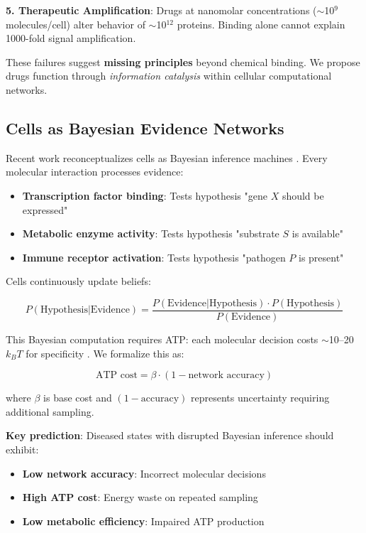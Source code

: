 \documentclass{article}
\begin{document}
\textbf{5. Therapeutic Amplification}: Drugs at nanomolar concentrations ($\sim$10$^9$ molecules/cell) alter behavior of $\sim$10$^{12}$ proteins. Binding alone cannot explain 1000-fold signal amplification.

These failures suggest \textbf{missing principles} beyond chemical binding. We propose drugs function through \textit{information catalysis} within cellular computational networks.

\subsection{Cells as Bayesian Evidence Networks}

Recent work reconceptualizes cells as Bayesian inference machines \citep{Friston2010,Navlakha2015}. Every molecular interaction processes evidence:

\begin{itemize}
    \item \textbf{Transcription factor binding}: Tests hypothesis "gene $X$ should be expressed"
    \item \textbf{Metabolic enzyme activity}: Tests hypothesis "substrate $S$ is available"
    \item \textbf{Immune receptor activation}: Tests hypothesis "pathogen $P$ is present"
\end{itemize}

Cells continuously update beliefs:

\begin{equation}
P(\text{Hypothesis} | \text{Evidence}) = \frac{P(\text{Evidence} | \text{Hypothesis}) \cdot P(\text{Hypothesis})}{P(\text{Evidence})}
\end{equation}

This Bayesian computation requires ATP: each molecular decision costs $\sim$10--20 $k_B T$ for specificity \citep{Lan2012}. We formalize this as:

\begin{equation}
\text{ATP cost} = \beta \cdot (1 - \text{network accuracy})
\end{equation}

where $\beta$ is base cost and $(1 - \text{accuracy})$ represents uncertainty requiring additional sampling.

\textbf{Key prediction}: Diseased states with disrupted Bayesian inference should exhibit:
\begin{itemize}
    \item \textbf{Low network accuracy}: Incorrect molecular decisions
    \item \textbf{High ATP cost}: Energy waste on repeated sampling
    \item \textbf{Low metabolic efficiency}: Impaired ATP production
\end{itemize}
\end{document}
